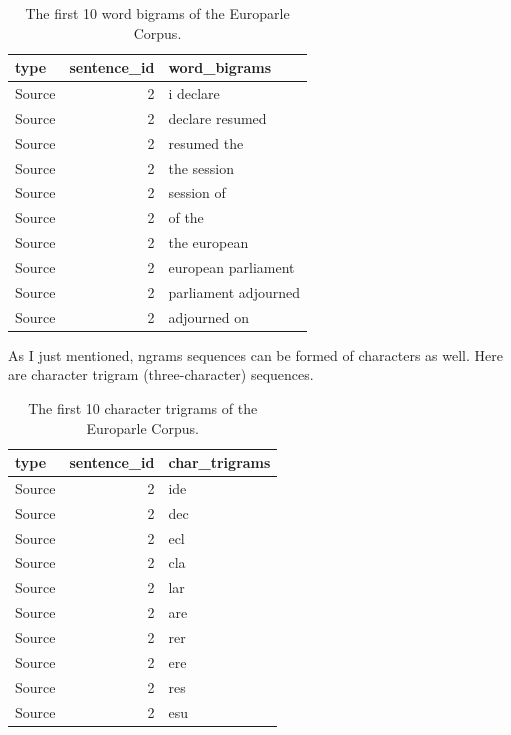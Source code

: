 \documentclass[
  letterpaper,
]{latex/krantz}
\begin{document}
\hypertarget{tbl-recoding-tokenization-europarle-bigram-words}{}
\begin{table}
\caption{\label{tbl-recoding-tokenization-europarle-bigram-words}The first 10 word bigrams of the Europarle Corpus. }\tabularnewline

\centering
\begin{tabular}{lrl}
\toprule
type & sentence\_id & word\_bigrams\\
\midrule
Source & 2 & i declare\\
Source & 2 & declare resumed\\
Source & 2 & resumed the\\
Source & 2 & the session\\
Source & 2 & session of\\
\addlinespace
Source & 2 & of the\\
Source & 2 & the european\\
Source & 2 & european parliament\\
Source & 2 & parliament adjourned\\
Source & 2 & adjourned on\\
\bottomrule
\end{tabular}
\end{table}

As I just mentioned, ngrams sequences can be formed of characters as
well. Here are character trigram (three-character) sequences.

\hypertarget{tbl-recoding-tokenization-europarle-trigram-chars}{}
\begin{table}
\caption{\label{tbl-recoding-tokenization-europarle-trigram-chars}The first 10 character trigrams of the Europarle Corpus. }\tabularnewline

\centering
\begin{tabular}{lrl}
\toprule
type & sentence\_id & char\_trigrams\\
\midrule
Source & 2 & ide\\
Source & 2 & dec\\
Source & 2 & ecl\\
Source & 2 & cla\\
Source & 2 & lar\\
\addlinespace
Source & 2 & are\\
Source & 2 & rer\\
Source & 2 & ere\\
Source & 2 & res\\
Source & 2 & esu\\
\bottomrule
\end{tabular}
\end{table}
\end{document}
